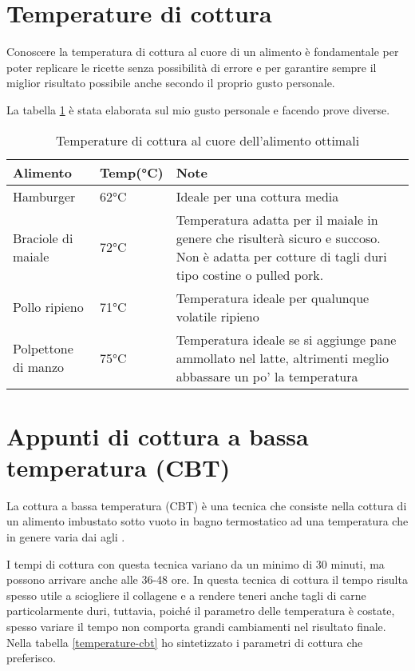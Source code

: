 \section{Temperature di cottura}
Conoscere la temperatura di cottura al cuore di un alimento è fondamentale per poter replicare le ricette senza possibilità di errore e per garantire sempre il miglior risultato possibile anche secondo il proprio gusto personale.

La tabella \ref{temperature-al-cuore} è stata elaborata sul mio gusto personale e facendo prove diverse.



\begin{table}
\begin{tabular}{llp{}}
\toprule
Alimento				&	Temp(°C)		&		Note		\\
\midrule
Hamburger			& 	62°C 		& Ideale per una cottura media\\
Braciole di maiale	& 	72°C 		& Temperatura adatta per il maiale in genere che risulterà sicuro e succoso. Non è adatta per cotture di tagli duri tipo costine o pulled pork. \\
Pollo ripieno 		& 	71°C 		& Temperatura ideale per qualunque volatile ripieno\\
Polpettone di manzo	&	75°C 		& Temperatura ideale se si aggiunge pane ammollato nel latte, altrimenti meglio abbassare un po' la temperatura\\
\bottomrule
\end{tabular}
\label{temperature-al-cuore}
\caption{Temperature di cottura al cuore dell'alimento ottimali}
\end{table}

\section{Appunti di cottura a bassa temperatura (CBT)}
La cottura a bassa temperatura (CBT) è una tecnica che consiste nella cottura di un alimento imbustato sotto vuoto in bagno termostatico ad una temperatura che in genere varia dai  agli .

I tempi di cottura con questa tecnica variano da un minimo di 30 minuti, ma possono arrivare anche alle 36-48 ore. In questa tecnica di cottura il tempo risulta spesso utile a sciogliere il collagene e a rendere teneri anche tagli di carne particolarmente duri, tuttavia, poiché il parametro delle temperatura è costate, spesso variare il tempo non comporta grandi cambiamenti nel risultato finale. Nella tabella \ref{temperature-cbt} ho sintetizzato i parametri di cottura che preferisco.

